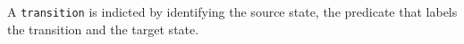  A {\tt transition} is indicted by identifying the
source state, the predicate that labels the transition and
the target state.